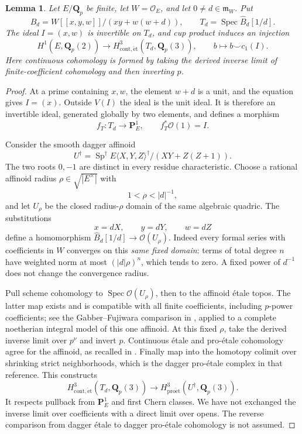 \documentclass[11pt,a4paper]{article}
\newtheorem{lemma}[theorem]{Lemma}
\theoremstyle{remark}
\newcommand{\Q}{\mathbf Q}
\newcommand{\PP}{\mathbf P}
\newcommand{\OO}{\mathcal O}
\newcommand{\Spec}{\operatorname{Spec}}
\begin{document}
\begin{lemma}\label{lem:completedcup}
Let $E/\Q_p$ be finite, let $W=\OO_E$, and let $0\ne d\in\mathfrak m_W$. Put
\[
\widehat B_d=W[[x,y,w]]/(xy+w(w+d)),\qquad
T_d=\Spec\widehat B_d[1/d].
\]
The ideal $I=(x,w)$ is invertible on $T_d$, and cup product induces an injection
\[
H^1(E,\Q_p(2))\longrightarrow
H^3_{\mathrm{cont},\mathrm{\acute et}}(T_d,\Q_p(3)),
\qquad b\longmapsto b\smile c_1(I).
\]
Here continuous cohomology is formed by taking the derived inverse limit of finite-coefficient cohomology and then inverting $p$.
\end{lemma}
\begin{proof}
At a prime containing $x,w$, the element $w+d$ is a unit, and the equation gives $I=(x)$. Outside $V(I)$ the ideal is the unit ideal. It is therefore an invertible ideal, generated globally by two elements, and defines a morphism
\[
f_T:T_d\longrightarrow\PP^1_E,\qquad f_T^*\OO(1)=I.
\]

Consider the smooth dagger affinoid
\[
U^\dagger=\operatorname{Sp}^\dagger
E\langle X,Y,Z\rangle^\dagger/(XY+Z(Z+1)).
\]
The two roots $0,-1$ are distinct in every residue characteristic. Choose a rational affinoid radius $\rho\in\sqrt{|E^\times|}$ with
\[
1<\rho<|d|^{-1},
\]
and let $U_\rho$ be the closed radius-$\rho$ domain of the same algebraic quadric. The substitutions
\begin{equation}\label{eq:fixedradius}
x=dX,\qquad y=dY,\qquad w=dZ
\end{equation}
define a homomorphism $\widehat B_d[1/d]\to\OO(U_\rho)$. Indeed every formal series with coefficients in $W$ converges on this \emph{same fixed domain}: terms of total degree $n$ have weighted norm at most $(|d|\rho)^n$, which tends to zero. A fixed power of $d^{-1}$ does not change the convergence radius.

Pull scheme cohomology to $\Spec\OO(U_\rho)$, then to the affinoid \'etale topos. The latter map exists and is compatible with all finite coefficients, including $p$-power coefficients; see the Gabber--Fujiwara comparison in \cite[Theorem~6.2.1]{Achinger}, applied to a complete noetherian integral model of this one affinoid. At this fixed $\rho$, take the derived inverse limit over $p^\nu$ and invert $p$. Continuous \'etale and pro-\'etale cohomology agree for the affinoid, as recalled in \cite[Section~3.2.3]{ColmezNiziol}. Finally map into the homotopy colimit over shrinking strict neighborhoods, which is the dagger pro-\'etale complex in that reference. This constructs
\begin{equation}\label{eq:schemetodagger}
H^3_{\mathrm{cont},\mathrm{\acute et}}(T_d,\Q_p(3))
\longrightarrow H^3_{\mathrm{pro\acute et}}(U^\dagger,\Q_p(3)).
\end{equation}
It respects pullback from $\PP^1_E$ and first Chern classes. We have not exchanged the inverse limit over coefficients with a direct limit over opens. The reverse comparison from dagger \'etale to dagger pro-\'etale cohomology is not assumed.


\end{proof}
\end{document}
